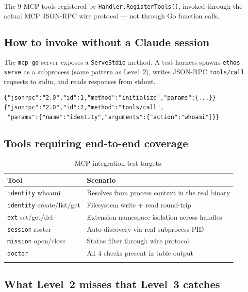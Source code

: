 \documentclass[a4paper,10pt]{article}
\newcommand{\pkg}[1]{\texttt{#1}}
\newcommand{\cmd}[1]{\texttt{#1}}
\begin{document}
The 9 MCP tools registered by \pkg{Handler.RegisterTools()}, invoked
through the actual MCP JSON-RPC wire protocol --- not through Go
function calls.

\subsection*{How to invoke without a Claude session}

The \pkg{mcp-go} server exposes a \pkg{ServeStdio} method.  A test
harness spawns \cmd{ethos serve} as a subprocess (same pattern as
Level~2), writes JSON-RPC \texttt{tools/call} requests to stdin, and
reads responses from stdout.

\begin{lstlisting}[language={}]
{"jsonrpc":"2.0","id":1,"method":"initialize","params":{...}}
{"jsonrpc":"2.0","id":2,"method":"tools/call",
 "params":{"name":"identity","arguments":{"action":"whoami"}}}
\end{lstlisting}

\subsection*{Tools requiring end-to-end coverage}

\begin{longtable}{ll}
\toprule
\textbf{Tool} & \textbf{Scenario} \\
\midrule
\endhead
\texttt{identity} whoami           & Resolves from process context in the real binary \\
\texttt{identity} create/list/get  & Filesystem write + read round-trip \\
\texttt{ext} set/get/del           & Extension namespace isolation across handles \\
\texttt{session} roster            & Auto-discovery via real subprocess PID \\
\texttt{mission} open/close        & Status filter through wire protocol \\
\texttt{doctor}                    & All 4 checks present in table output \\
\bottomrule
\caption{MCP integration test targets.}
\end{longtable}

\subsection*{What Level~2 misses that Level~3 catches}
\end{document}
